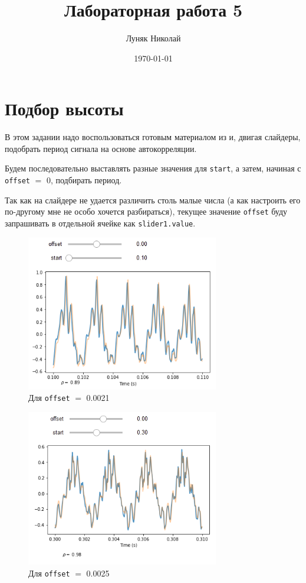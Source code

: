 \documentclass[a4paper,12pt]{report}
\author{Луняк Николай}
\title{Лабораторная работа 5}
\date{\today}
\begin{document}
    \maketitle
    \tableofcontents
    \listoffigures
    \lstlistoflistings
    
    \chapter{Подбор высоты}
    
    В этом задании надо воспользоваться готовым материалом из  и, двигая слайдеры, подобрать период сигнала на основе автокорреляции.
    
    Будем последовательно выставлять разные значения для \texttt{start}, а затем, начиная с \texttt{offset} $=$ 0, подбирать период.
    
    Так как на слайдере не удается различить столь малые числа (а как настроить его по-другому мне не особо хочется разбираться), текущее значение \texttt{offset} буду запрашивать в отдельной ячейке как \texttt{slider1.value}.

    \begin{figure}[H]
        \centering
        \includegraphics[width=0.75\textwidth]{ex1_21.png}
        \caption{Для \texttt{offset} $=$ 0.0021}
        \label{fig:ex1_21}
    \end{figure}
    
    \begin{figure}[H]
        \centering
        \includegraphics[width=0.75\textwidth]{ex1_25.png}
        \caption{Для \texttt{offset} $=$ 0.0025}
        \label{fig:ex1_25}
    \end{figure}
    
\end{document}

